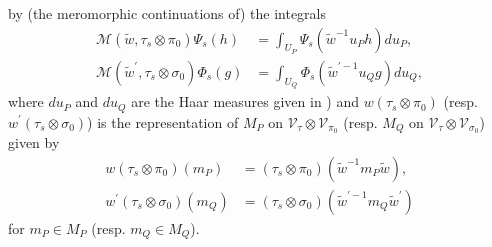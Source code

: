 \documentclass[article]{article}
\numberwithin{equation}{section}
\theoremstyle{definition}
\begin{document}
by (the meromorphic continuations of) the integrals
\begin{align*}
 \mathcal{M}\left(\widetilde{w}, \tau_{s} \otimes \pi_0 \right) \Psi_{s}\left(h\right) &= \int_{U_{P}} \Psi_{s}\left(\widetilde{w}^{-1} u_{P} h\right) d u_{P}, \\ 
\mathcal{M}\left(\widetilde{w}^{\prime}, \tau_{s} \otimes \sigma_0 \right) \Phi_{s}\left(g\right) &=\int_{U_{Q}} \Phi_{s}\left(\widetilde{w}^{\prime-1} u_{Q} g\right) d u_{Q}, \end{align*}
where $du_P$ and $du_Q$ are the Haar measures given in \cite[\S 6.3]{MR3788848}) and $w\left(\tau_{s} \otimes \pi_0 \right)$ (resp. $w^{\prime}\left(\tau_{s} \otimes \sigma_0 \right) $) is the representation of $M_{P}$ on $\mathscr{V}_{\tau} \otimes \mathscr{V}_{\pi_0}$ (resp. $M_{Q}$ on $\mathscr{V}_{\tau} \otimes \mathscr{V}_{\sigma_0} $) given by 
\begin{align*}
w\left(\tau_{s} \otimes \pi_0 \right)\left(m_{P}\right)&=\left(\tau_{s} \otimes \pi_0 \right)\left(\widetilde{w}^{-1} m_{P} \widetilde{w}\right),\\
w^{\prime}\left(\tau_{s} \otimes \sigma_0 \right)\left(m_{Q}\right) &=\left(\tau_{s} \otimes \sigma_0 \right)\left(\widetilde{w}^{\prime-1} m_{Q} \widetilde{w}^{\prime}\right)
\end{align*}
for $m_{P} \in M_{P}$ (resp. $m_{Q}\in M_Q$). 
\end{document}
